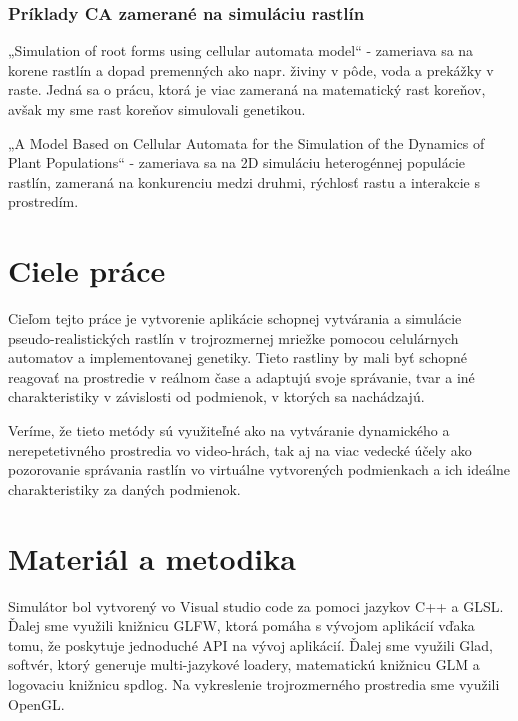 \documentclass[12pt]{article}
\begin{document}
\subsubsection{Príklady CA zamerané na simuláciu rastlín}

„Simulation of root forms using cellular automata model“ - zameriava sa na
korene rastlín a dopad premenných ako napr. živiny v pôde, voda a prekážky
v raste. Jedná sa o prácu, ktorá je viac zameraná na matematický rast koreňov,
avšak my sme rast koreňov simulovali genetikou.

„A Model Based on Cellular Automata for the Simulation of the Dynamics of
Plant Populations“ - zameriava sa na 2D simuláciu heterogénnej populácie
rastlín, zameraná na konkurenciu medzi druhmi, rýchlosť rastu a interakcie
s prostredím.

\section{Ciele práce}

Cieľom tejto práce je vytvorenie aplikácie schopnej vytvárania a simulácie
pseudo-rea\-listických rastlín v trojrozmernej mriežke pomocou celulárnych
automatov a implementovanej genetiky.
Tieto rastliny by mali byť schopné reagovať na prostredie v reálnom čase
a adaptujú svoje správanie, tvar a iné charakteristiky v závislosti
od podmienok, v ktorých sa nachádzajú.

Veríme, že tieto metódy sú využiteľné ako na vytváranie dynamického
a nerepetetivného prostredia vo video-hrách, tak aj na viac vedecké účely
ako pozorovanie správania rastlín vo virtuálne vytvorených podmienkach
a ich ideálne charakteristiky za daných podmienok.

\section{Materiál a metodika}

Simulátor %
bol vytvorený vo Visual studio code za pomoci jazykov C++ a GLSL.
Ďalej sme využili knižnicu GLFW, ktorá pomáha s vývojom aplikácií vďaka tomu,
že poskytuje jednoduché API na vývoj aplikácií. Ďalej sme využili Glad,
softvér, ktorý generuje multi-jazykové loadery, matematickú knižnicu GLM
a logovaciu knižnicu spdlog. Na vykreslenie trojrozmerného prostredia sme
využili OpenGL.
\end{document}
